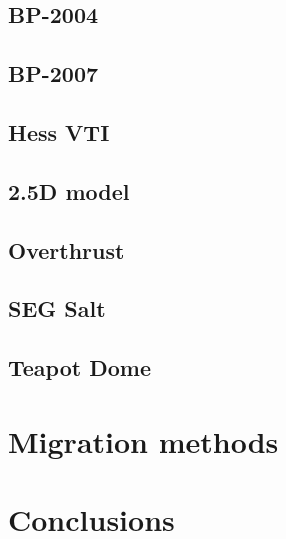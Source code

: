 \subsection{BP-2004}

\subsection{BP-2007}

\subsection{Hess VTI}

\subsection{2.5D model}

\subsection{Overthrust}

\subsection{SEG Salt}

\subsection{Teapot Dome}

\section{Migration methods}

\section{Conclusions}




